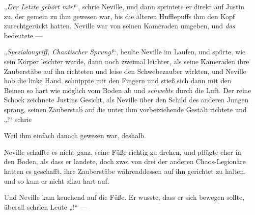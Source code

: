 „\emph{Der Letzte gehört mir!}“, schrie Neville, und dann sprintete er direkt auf Justin zu, der gemein zu ihm gewesen war, bis die älteren Hufflepuffs ihm den Kopf zurechtgerückt hatten. Neville war von seinen Kameraden umgeben, und \emph{das} bedeutete —

„\emph{Spezialangriff, Chaotischer Sprung!}“, heulte Neville im Laufen, und spürte, wie sein Körper leichter wurde, dann noch zweimal leichter, als seine Kameraden ihre Zauberstäbe auf ihn richteten und leise den Schwebezauber wirkten, und Neville hob die linke Hand, schnippte mit den Fingern und stieß sich dann mit den Beinen so hart wie möglich vom Boden ab und \emph{schwebte} durch die Luft. Der reine Schock zeichnete Justins Gesicht, als Neville über den Schild des anderen Jungen sprang, seinen Zauberstab auf die unter ihm vorbeiziehende Gestalt richtete und „!“ schrie

Weil ihm einfach danach gewesen war, deshalb.

Neville schaffte es nicht ganz, seine Füße richtig zu drehen, und pflügte eher in den Boden, als dass er landete, doch zwei von drei der anderen Chaos-Legionäre hatten es geschafft, ihre Zauberstäbe währenddessen auf ihn gerichtet zu halten, und so kam er nicht allzu hart auf.

Und Neville kam keuchend auf die Füße. Er wusste, dass er sich bewegen sollte, überall schrien Leute „!“ —

